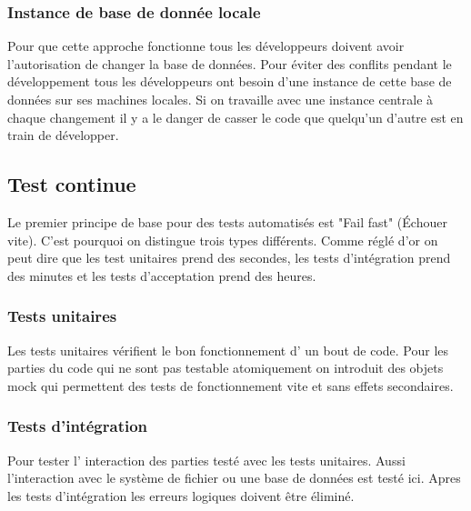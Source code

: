 

\subsubsection{Instance de base de donnée locale}

Pour que cette approche fonctionne tous les développeurs doivent avoir l'autorisation de changer la base de données. Pour éviter des conflits pendant le développement tous les développeurs ont besoin d'une instance de cette base de données sur ses machines locales. Si on travaille avec une instance centrale à chaque changement il y a le danger de casser le code que quelqu'un d'autre est en train de développer.
\newpage


\subsection{Test continue}
Le premier principe de base pour des tests automatisés est "Fail fast" (Échouer vite).
C'est pourquoi on distingue trois types différents. Comme réglé d'or on  peut dire que les test unitaires prend des secondes, les tests d'intégration prend des minutes et les tests d'acceptation prend des heures.\nocite{artofunittesting}
\subsubsection{Tests unitaires}
Les tests unitaires vérifient le bon fonctionnement d' un bout de code. Pour les parties du code qui ne sont pas testable atomiquement on introduit des objets mock qui permettent des tests de fonctionnement vite et sans effets secondaires. 
\subsubsection{Tests d'intégration}
Pour tester l' interaction des parties testé avec les tests unitaires. Aussi l'interaction avec le système de fichier ou une base de données est testé ici. Apres les tests d'intégration les erreurs logiques doivent être éliminé.
